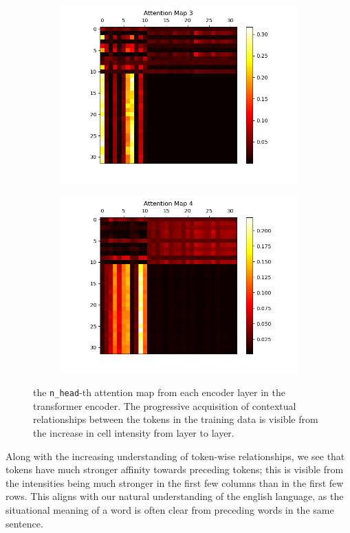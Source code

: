 \documentclass[10pt]{article}
\newcommand{\code}[1]{\texttt{#1}}
\theoremstyle{definition}
\begin{document}
\begin{figure}[H]
\begin{subfigure}[b]{0.45\textwidth}
        \includegraphics[width=\textwidth]{../data/plots/part1/attention_map_3.png}
        \label{subfig:am3}
    \end{subfigure}
    \hfill
    \begin{subfigure}[b]{0.45\textwidth}
        \centering
        \includegraphics[width=\textwidth]{../data/plots/part1/attention_map_4.png}
        \label{subfig:am4}
    \end{subfigure}
\caption{the \code{n\_head}-th attention map from each encoder layer in the transformer encoder. The progressive acquisition of contextual relationships between the tokens in the training data is visible from the increase in cell intensity from layer to layer.}
\end{figure}
\noindent Along with the increasing understanding of token-wise relationships, we see that tokens have much stronger affinity towards preceding tokens; this is visible from the intensities being much stronger in the first few columns than in the first few rows. This aligns with our natural understanding of the english language, as the situational meaning of a word is often clear from preceding words in the same sentence.
\end{document}
